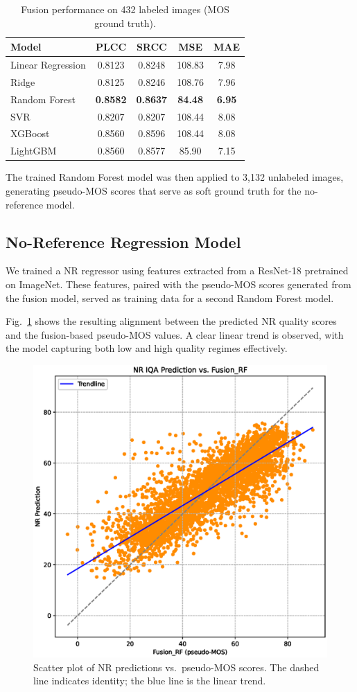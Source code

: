 \begin{table}
\caption{Fusion performance on 432 labeled images (MOS ground truth).}
\begin{center}
\begin{tabular}{lcccc}
\toprule
\textbf{Model} & \textbf{PLCC} & \textbf{SRCC} & \textbf{MSE} & \textbf{MAE} \\
\midrule
Linear Regression & 0.8123 & 0.8248 & 108.83 & 7.98 \\
Ridge             & 0.8125 & 0.8246 & 108.76 & 7.96 \\
Random Forest     & \textbf{0.8582} & \textbf{0.8637} & \textbf{84.48}  & \textbf{6.95} \\
SVR               & 0.8207 & 0.8207 & 108.44 & 8.08 \\
XGBoost           & 0.8560 & 0.8596 & 108.44 & 8.08 \\
LightGBM          & 0.8560 & 0.8577 & 85.90  & 7.15 \\
\bottomrule
\end{tabular}\label{tab:fusion_scores}
\end{center}
\end{table}

The trained Random Forest model was then applied to 3,132 unlabeled images, generating pseudo-MOS scores that serve as soft ground truth for the no-reference model.

\subsection{No-Reference Regression Model}

We trained a NR regressor using features extracted from a ResNet-18 pretrained on ImageNet. These features, paired with the pseudo-MOS scores generated from the fusion model, served as training data for a second Random Forest model.

Fig.~\ref{fig:nr_vs_fusion} shows the resulting alignment between the predicted NR quality scores and the fusion-based pseudo-MOS values. A clear linear trend is observed, with the model capturing both low and high quality regimes effectively.

\begin{figure}
    \centering
    \includegraphics[width=0.6\linewidth]{images/nr_vs_fusion_rf.eps}
    \caption{Scatter plot of NR predictions vs.\ pseudo-MOS scores. The dashed line indicates identity; the blue line is the linear trend.}\label{fig:nr_vs_fusion}
\end{figure}

